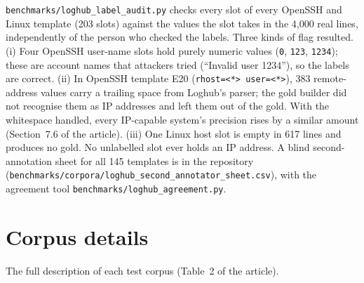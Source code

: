 \documentclass[11pt,a4paper]{article}
\begin{document}
\texttt{benchmarks/loghub\_label\_audit.py} checks every slot of every OpenSSH and Linux template (203 slots) against the values the slot takes in the 4,000 real lines, independently of the person who checked the labels. Three kinds of flag resulted. (i) Four OpenSSH user-name slots hold purely numeric values (\texttt{0}, \texttt{123}, \texttt{1234}); these are account names that attackers tried (``Invalid user 1234''), so the labels are correct. (ii) In OpenSSH template E20 (\texttt{rhost=<*> user=<*>}), 383 remote-address values carry a trailing space from Loghub's parser; the gold builder did not recognise them as IP addresses and left them out of the gold. With the whitespace handled, every IP-capable system's precision rises by a similar amount (Section~7.6 of the article). (iii) One Linux host slot is empty in 617 lines and produces no gold. No unlabelled slot ever holds an IP address. A blind second-annotation sheet for all 145 templates is in the repository (\texttt{benchmarks/corpora/loghub\_second\_annotator\_sheet.csv}), with the agreement tool \texttt{benchmarks/loghub\_agreement.py}.

\section{Corpus details}\label{s:corpora}

The full description of each test corpus (Table~2 of the article).
\end{document}
